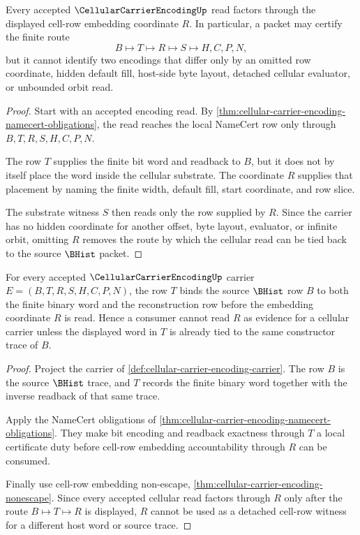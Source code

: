 \begin{theorem}
\label{thm:cellular-carrier-encoding-nonescape}
Every accepted $\CellularCarrierEncodingUp$ read factors through the displayed cell-row embedding coordinate $R$. In particular, a packet may certify the finite route
$$
B \longmapsto T \longmapsto R \longmapsto S \longmapsto H,C,P,N,
$$
but it cannot identify two encodings that differ only by an omitted row coordinate, hidden default fill, host-side byte layout, detached cellular evaluator, or unbounded orbit read.
\end{theorem}
\begin{proof}
Start with an accepted encoding read. By \autoref{thm:cellular-carrier-encoding-namecert-obligations}, the read reaches the local NameCert row only through $B,T,R,S,H,C,P,N$.

The row $T$ supplies the finite bit word and readback to $B$, but it does not by itself place the word inside the cellular substrate. The coordinate $R$ supplies that placement by naming the finite width, default fill, start coordinate, and row slice.

The substrate witness $S$ then reads only the row supplied by $R$. Since the carrier has no hidden coordinate for another offset, byte layout, evaluator, or infinite orbit, omitting $R$ removes the route by which the cellular read can be tied back to the source $\BHist$ packet.
\end{proof}

\begin{theorem}
\label{thm:cellular-carrier-encoding-readback-exactness}
For every accepted $\CellularCarrierEncodingUp$ carrier $E=(B,T,R,S,H,C,P,N)$, the row $T$ binds the source $\BHist$ row $B$ to both the finite binary word and the reconstruction row before the embedding coordinate $R$ is read. Hence a consumer cannot read $R$ as evidence for a cellular carrier unless the displayed word in $T$ is already tied to the same constructor trace of $B$.
\end{theorem}
\begin{proof}
Project the carrier of \autoref{def:cellular-carrier-encoding-carrier}. The row $B$ is the source $\BHist$ trace, and $T$ records the finite binary word together with the inverse readback of that same trace.

Apply the NameCert obligations of \autoref{thm:cellular-carrier-encoding-namecert-obligations}. They make bit encoding and readback exactness through $T$ a local certificate duty before cell-row embedding accountability through $R$ can be consumed.

Finally use cell-row embedding non-escape, \autoref{thm:cellular-carrier-encoding-nonescape}. Since every accepted cellular read factors through $R$ only after the route $B \longmapsto T \longmapsto R$ is displayed, $R$ cannot be used as a detached cell-row witness for a different host word or source trace.
\end{proof}

